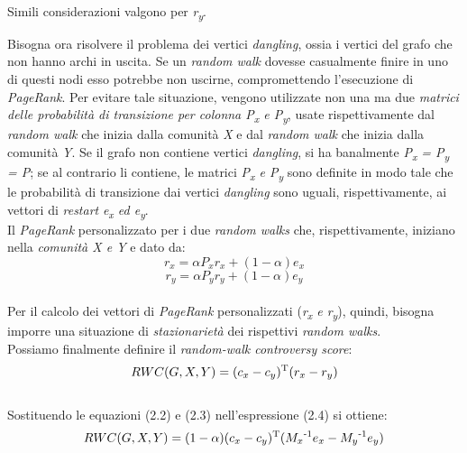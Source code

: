 \begin{enumerate}
\begin{itemize}
\\Simili considerazioni valgono per \textit{r\textsubscript{y}}.
\end{itemize}
Bisogna ora risolvere il problema dei vertici \textit{dangling}, ossia i vertici del grafo che non hanno archi in uscita. Se un \textit{random walk} dovesse casualmente finire in uno di questi nodi esso potrebbe non uscirne, compromettendo l'esecuzione di \textit{PageRank}. Per evitare tale situazione, vengono utilizzate non una ma due \textit{matrici delle probabilità di transizione per colonna P\textsubscript{x} e P\textsubscript{y}}, usate rispettivamente dal \textit{random walk} che inizia dalla comunità \textit{X} e dal \textit{random walk} che inizia dalla comunità \textit{Y}. Se il grafo non contiene vertici \textit{dangling}, si ha banalmente \textit{P\textsubscript{x} = P\textsubscript{y} = P}; se al contrario li contiene, le matrici \textit{P\textsubscript{x} e P\textsubscript{y}} sono definite in modo tale che le probabilità di transizione dai vertici \textit{dangling} sono uguali, rispettivamente, ai vettori di \textit{restart} \textit{e\textsubscript{x} ed e\textsubscript{y}}.
\\Il \textit{PageRank} personalizzato per i due \textit{random walks} che, rispettivamente, iniziano nella \textit{comunità X e Y} e dato da:
\\
\begin{equation}
r_x = \alpha P_xr_x + (1-\alpha)e_x
\end{equation}
\begin{equation}
r_y = \alpha P_yr_y + (1-\alpha)e_y
\end{equation}
\\
Per il calcolo dei vettori di \textit{PageRank} personalizzati (\textit{r\textsubscript{x} e r\textsubscript{y}}), quindi, bisogna imporre una situazione di \textit{stazionarietà} dei rispettivi \textit{random walks}. 
\\Possiamo finalmente definire il \textit{random-walk controversy score}:
\\
\begin{equation}
RWC(G,X,Y) = (c_x - c_y)\textsuperscript{T}(r_x - r_y)
\end{equation}
\\
Sostituendo le equazioni (2.2) e (2.3) nell'espressione (2.4) si ottiene:
\\
\begin{equation}
RWC(G,X,Y) = (1 - \alpha)(c_x - c_y)\textsuperscript{T}(M_x\textsuperscript{-1}e_x - M_y\textsuperscript{-1}e_y)

\end{equation}
\end{enumerate}

